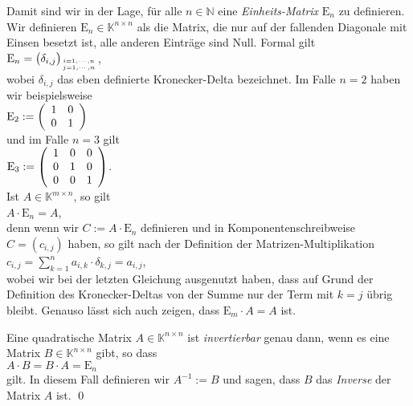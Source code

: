 Damit sind wir in der Lage, f\"{u}r alle $n \in \mathbb{N}$ eine \emph{Einheits-Matrix} $\mathrm{E}_n$ zu
definieren.  Wir definieren $\mathrm{E}_n \in \mathbb{K}^{n \times n}$ als die Matrix, die nur auf der
fallenden Diagonale mit Einsen besetzt ist, alle anderen Eintr\"{a}ge sind Null.  Formal
gilt
\\[0.2cm]
\hspace*{1.3cm}
$\mathrm{E}_n = \bigl(\delta_{i,j}\bigr)_{i=1,\cdots,n \atop j=1,\cdots,n}$,
\\[0.2cm]
wobei $\delta_{i,j}$ das eben definierte Kronecker-Delta bezeichnet.  
Im Falle $n = 2$ haben wir beispielsweise
\\[0.2cm]
\hspace*{1.3cm}
$\mathrm{E}_2 := \left(
  \begin{array}[c]{ll}
    1 & 0 \\
    0 & 1 \\
  \end{array}
  \right)
$
\\[0.2cm]
und im Falle $n = 3$ gilt
\\[0.2cm]
\hspace*{1.3cm}
$\mathrm{E}_3 := \left(
  \begin{array}[c]{lll}
    1 & 0 & 0 \\
    0 & 1 & 0 \\
    0 & 0 & 1 \\
  \end{array}
  \right)
$.
\\[0.2cm]
Ist $A \in \mathbb{K}^{m \times n}$,
so gilt
\\[0.2cm]
\hspace*{1.3cm}
$A \cdot \mathrm{E}_n = A$,
\\[0.2cm]
denn wenn wir $C := A \cdot \mathrm{E}_n$ definieren und in Komponentenschreibweise $C = (c_{i,j})$ haben, so
gilt nach der Definition der Matrizen-Multiplikation
\\[0.2cm]
\hspace*{1.3cm}
$c_{i,j} = \sum\limits_{k=1}^n a_{i,k} \cdot \delta_{k,j} = a_{i,j}$,
\\[0.2cm]
wobei wir bei der letzten Gleichung ausgenutzt haben, dass auf Grund der Definition des
Kronecker-Deltas von der Summe nur der Term mit $k = j$ \"{u}brig bleibt.  Genauso l\"{a}sst sich auch
zeigen, dass $\mathrm{E}_m \cdot A = A$ ist.

\begin{Definition}
  Eine quadratische Matrix $A \in \mathbb{K}^{n \times n}$ ist \emph{invertierbar} genau dann, wenn
  es eine Matrix $B \in \mathbb{K}^{n \times n}$ gibt, so dass 
  \\[0.2cm]
  \hspace*{1.3cm}
  $A \cdot B = B \cdot A = \mathrm{E}_n$
  \\[0.2cm]
  gilt.  In diesem Fall definieren wir $A^{-1} := B$ und sagen, dass $B$ das \emph{Inverse} der
  Matrix $A$ ist.  \qed
\end{Definition}

